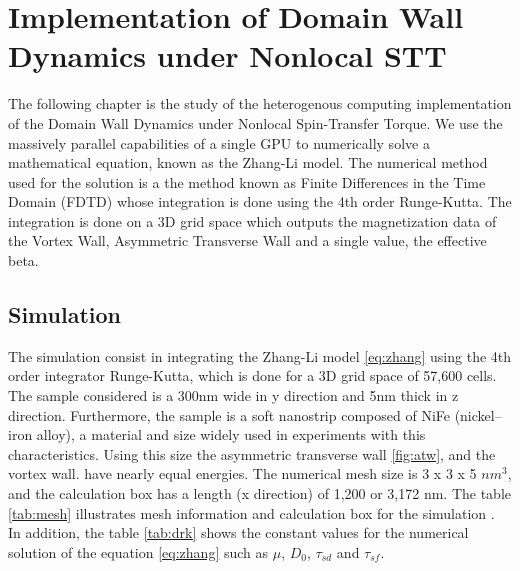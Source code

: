 
\chapter{Implementation of Domain Wall Dynamics under Nonlocal STT} %

\label{Implementation of Domain Wall Dynamics under Nonlocal STT} %


The following chapter is the study of the heterogenous computing implementation of the Domain Wall Dynamics under Nonlocal Spin-Transfer Torque. We use the massively parallel capabilities of a single GPU to numerically solve a mathematical equation, known as the Zhang-Li model. The numerical method used for the solution is a the method known as Finite Differences in the Time Domain (FDTD) whose integration is done using the 4th order Runge-Kutta. The integration is done on a 3D grid space which outputs the magnetization data of the Vortex Wall, Asymmetric Transverse Wall and a single value, the effective beta.

\section{Simulation}

The simulation consist in integrating the Zhang-Li model \ref{eq:zhang} using the 4th order integrator Runge-Kutta, which is done for a 3D grid space of 57,600 cells. The sample considered is a 300nm wide in y direction and 5nm thick in z direction. Furthermore, the sample is a soft nanostrip composed of NiFe (nickel–iron alloy), a material and size widely used in experiments with this characteristics. Using this size the asymmetric transverse wall \ref{fig:atw}, and the vortex wall. have nearly equal energies. The numerical mesh size is 3 x 3 x 5 $nm^3$, and the calculation box has a length (x direction) of 1,200 or 3,172 nm. The table \ref{tab:mesh} illustrates mesh information and calculation box for the simulation \cite{claudio}. In addition, the table \ref{tab:drk} shows the constant values for the numerical solution of the equation \ref{eq:zhang} such as $\mu$, $D_{0}$, $\tau_{sd}$ and $\tau_{sf}$.

